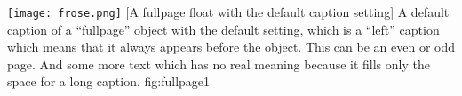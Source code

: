 \documentclass{scrartcl}
\begin{document}
\Float[capPos=after]
%
  {\texttt{[image: frose.png]}}%
  [A fullpage float with the default caption setting]%
  {A default caption of a ``fullpage'' object with the default setting, which
   is a ``left''  caption which means that it always appears before the object.
   This can be an even or odd page. And some more text which has no
   real meaning because it fills only the space for a long caption.}%
  {fig:fullpage1}

\blinddocument


\Blindtext
\end{document}
